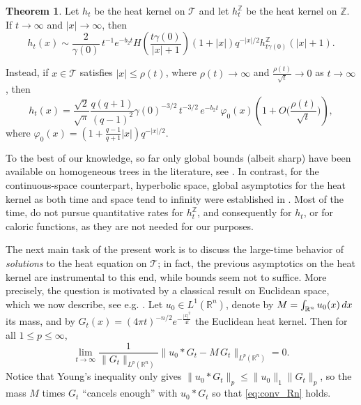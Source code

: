 \documentclass[10pt,a4paper]{amsart}
\renewcommand\mathcal{\mathscr}
\def\int{\intop\nolimits}
\theoremstyle{plain}
\theoremstyle{remark}
\theoremstyle{definition}
\newtheorem{thmx}{Theorem}
\begin{document}
\begin{thmx}\label{thm:thmA}
Let $h_t$ be the heat kernel on $\mathcal{T}$ and let
$h_t^{\mathbb Z}$ be the heat kernel on $\mathbb Z$. If
$t\to\infty$ and $|x|\to\infty$, then
\[
h_t(x)\sim
\frac{2}{\gamma(0)}\,t^{-1}e^{-b_2t}
H\!\left(\frac{t\gamma(0)}{|x|+1}\right)
(1+|x|)q^{-|x|/2}
h_{t\gamma(0)}^{\mathbb Z}(|x|+1).
\]


\noindent Instead, if $x\in \mathcal{T}$ satisfies $|x|\leq \rho(t)$, where $\rho(t)\to \infty$ and  $\frac{\rho(t)}{\sqrt{t}}\to 0$ as $t\to \infty$, then
		\[
		h_t(x)=\frac{\sqrt{2}}{\sqrt{\pi}}\frac{q(q+1)}{(q-1)^2}\gamma(0)^{-3/2}\, t^{-3/2}\,e^{-b_2t}\, \varphi_0(x)\left(1+O\Big(\frac{\rho(t)}{\sqrt{t}}\Big)\right), 
		\]
        where $\varphi_0(x)=\left(1+\frac{q-1}{q+1}|x|\right)q^{-|x|/2}$.
	\end{thmx}

To the best of our knowledge, so far only global bounds (albeit sharp) have been available on homogeneous trees in the literature, see \cite[Proposition 2.5]{CMS}. In contrast, for the continuous-space counterpart, hyperbolic space, global asymptotics for the heat kernel as both time and space tend to infinity were established in \cite{AJ99}. Most of the time, do not pursue quantitative rates for $h_t^{\mathbb Z}$, and consequently for $h_t$, or for caloric functions, as they are not needed for our purposes.


The next main task of the present work is to discuss the large-time behavior of \textit{solutions} to the heat equation on $\mathcal{T}$; in fact, the previous asymptotics on the heat kernel are instrumental to this end, while bounds seem not to suffice. More precisely, the question is motivated by a classical result on Euclidean space, which we now describe, see e.g. \cite{Vaz0}. Let $u_0\in L^1(\mathbb{R}^n)$, denote by $M=\int_{\mathbb{R}^n}u_0(x)\, dx$ its mass, and by $G_t(x) = (4\pi t)^{-n/2}e^{-\frac{|x|^2}{4t}}$ the Euclidean heat kernel. Then for all $1\leq p\leq \infty$,
\begin{equation}\label{eq:conv_Rn}
		\lim_{t \to \infty} 
		\frac{1}{\|G_t\|_{L^p(\mathbb{R}^n)}}
		\| u_0\ast G_t-M\, G_t\|_{L^p(\mathbb{R}^n)}=0.
		\end{equation}
        Notice that Young's inequality only gives $\|u_0\ast G_t\|_{p}\leq \|u_0\|_{1}\|G_t\|_{p}$, so the mass $M$ times $G_t$ ``cancels enough'' with $u_0\ast G_t$ so that \eqref{eq:conv_Rn} holds.
        
\end{document}
